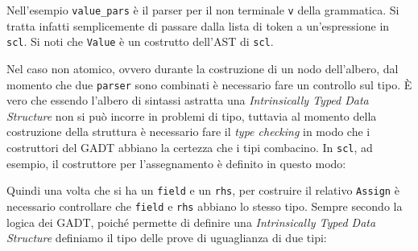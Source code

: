 \documentclass[12pt,a4paper]{report}
\begin{document}
\begin{Shaded}
\begin{Highlighting}[]
\NormalTok{ | }\NormalTok{,}
\NormalTok{ | _ -> }

\end{Highlighting}
\end{Shaded}

Nell'esempio \texttt{value\_pars} è il parser per il non terminale
\texttt{v} della grammatica. Si tratta infatti semplicemente di passare
dalla lista di token a un'espressione in \texttt{scl}. Si noti che
\texttt{Value} è un costrutto dell'AST di \texttt{scl}.

Nel caso non atomico, ovvero durante la costruzione di un nodo
dell'albero, dal momento che due \texttt{parser} sono combinati è
necessario fare un controllo sul tipo. È vero che essendo l'albero di
sintassi astratta una \emph{Intrinsically Typed Data Structure} non si
può incorre in problemi di tipo, tuttavia al momento della costruzione
della struttura è necessario fare il \emph{type checking} in modo che i
costruttori del GADT abbiano la certezza che i tipi combacino. In
\texttt{scl}, ad esempio, il costruttore per l'assegnamento è definito
in questo modo:

\begin{Shaded}
\begin{Highlighting}[]
\end{Highlighting}
\end{Shaded}

Quindi una volta che si ha un \texttt{field} e un \texttt{rhs}, per
costruire il relativo \texttt{Assign} è necessario controllare che
\texttt{field} e \texttt{rhs} abbiano lo stesso tipo. Sempre secondo la
logica dei GADT, poiché permette di definire una \emph{Intrinsically
Typed Data Structure} definiamo il tipo delle prove di uguaglianza di
due tipi:
\end{document}
